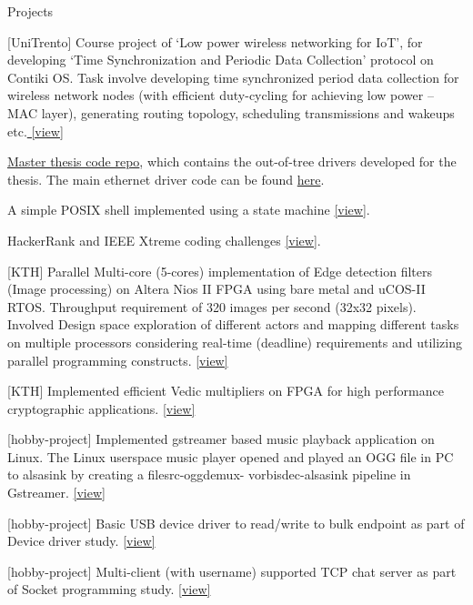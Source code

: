 \documentclass[
	a4paper, %
	11pt, %
]{resume} %
\begin{document}
\begin{rSection}{Projects}

        \item {[UniTrento]} Course project of ‘Low power wireless networking for IoT’, for developing ‘Time Synchronization and Periodic Data Collection’ protocol on Contiki OS. Task involve developing time synchronized period data collection for wireless network nodes (with efficient duty-cycling for achieving low power – MAC layer), generating routing topology, scheduling transmissions and wakeups etc.\href{https://github.com/sebinsphilip/LowPowerWN\_IOT}{ [view]}
        \item {} \href{https://github.com/sebinsphilip/zephyr\_xmc}{Master thesis code repo}, which contains the out-of-tree drivers developed for the thesis. The main ethernet driver code can be found \href{https://github.com/sebinsphilip/zephyr\_xmc/tree/main/drivers/zephyr/ethernet}{here}.
        \item {} A simple POSIX shell implemented using a state machine \href{https://github.com/sebinsphilip/matician\_shell}{[view]}.
        \item {} HackerRank and IEEE Xtreme coding challenges \href{https://github.com/sebinsphilip/coding\_challenge}{[view]}.
        \item {[KTH]} Parallel Multi-core (5-cores) implementation of Edge detection filters (Image processing) on Altera Nios II FPGA using bare metal and uCOS-II RTOS. Throughput requirement of 320 images per second (32x32 pixels). Involved Design space exploration of different actors and mapping different tasks on multiple processors considering real-time (deadline) requirements and utilizing parallel programming constructs. \href{https://github.com/sebinsphilip/Embedded\_software\_lab} {[view]}
        \item {[KTH]} Implemented efficient Vedic multipliers on FPGA for high performance cryptographic applications. \href{https://github.com/sebinsphilip/vedic\_multiplier\_kth\_writing\_course}{[view]}
        \item {[hobby-project]} Implemented gstreamer based music playback application on Linux. The Linux userspace music player opened and played an OGG file in PC to alsasink by creating a filesrc-oggdemux- vorbisdec-alsasink pipeline in Gstreamer.
        \href{https://github.com/sebinsphilip/gstreamer\_applications}{[view]}
        \item {[hobby-project]} Basic USB device driver to read/write to bulk endpoint as part of Device driver study. \href{https://github.com/sebinsphilip/device\_drivers}{[view]}
        \item {[hobby-project]} Multi-client (with username) supported TCP chat server as part of Socket programming study. \href{https://github.com/sebinsphilip/sockets}{[view]}

\end{rSection}
\end{document}
